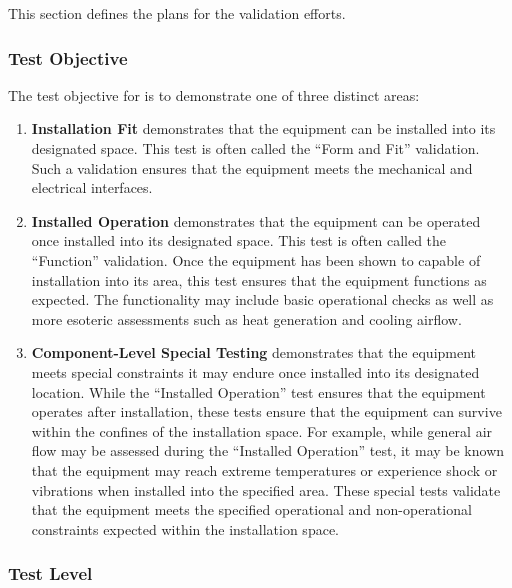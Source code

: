 


This section defines the plans for the \TestIdNameX validation efforts.

\subsubsection{Test Objective}
\label{loc:TestObjective\TestIdName}

The test objective for \TestIdNameX is to demonstrate one of three distinct areas:
\begin{enumerate}[itemindent=5pt,topsep=0pt,itemsep=0pt,partopsep=0pt, parsep=0pt]
	\item {\bf Installation Fit} demonstrates that the equipment can be installed into its designated space.
This test is often called the ``Form and Fit'' validation.
Such a validation ensures that the equipment meets the mechanical and electrical interfaces.
	\item {\bf Installed Operation} demonstrates that the equipment can be operated once installed into its designated space.
This test is often called the ``Function'' validation.
Once the equipment has been shown to capable of installation into its area, this test ensures that the equipment functions as expected.
The functionality may include basic operational checks as well as more esoteric assessments such as heat generation and cooling airflow.
	\item {\bf Component-Level Special Testing} demonstrates that the equipment meets special constraints it may endure once installed into its designated location.
While the ``Installed Operation'' test ensures that the equipment operates after installation, these tests ensure that the equipment can survive within the confines of the installation space.
For example, while general air flow may be assessed during the ``Installed Operation'' test, it may be known that the equipment may reach extreme temperatures or experience shock or vibrations when installed into the specified area.
These special tests validate that the equipment meets the specified operational and non-operational constraints expected within the installation space. 
\end{enumerate}


\subsubsection{Test Level}
\label{loc:TestLevels\TestIdName}

